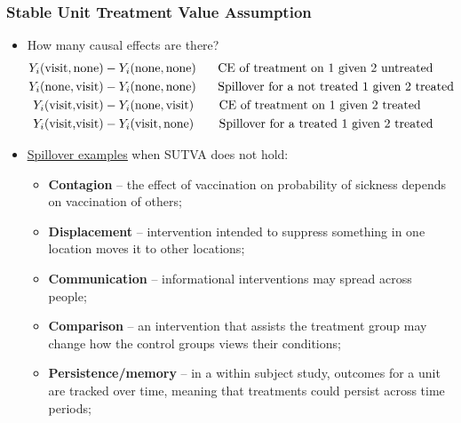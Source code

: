 \documentclass[aspectratio=169]{beamer}
\theoremstyle{principle}
\begin{document}
\begin{frame}
\frametitle{Stable Unit Treatment Value Assumption}
\begin{itemize}
\item How many causal effects are there?
\begin{align*}
Y_i(\mbox{visit},\mbox{none}) &- Y_i(\mbox{none},\mbox{none}) \hspace{5mm}\mbox{ CE of treatment on 1 given 2 untreated}\\
Y_i(\mbox{none},\mbox{visit}) &- Y_i(\mbox{none},\mbox{none}) \hspace{5mm}\mbox{ Spillover for a not treated 1 given 2 treated}\\
Y_i(\mbox{visit,visit}) &- Y_i(\mbox{none},\mbox{visit}) \hspace{6mm}\mbox{ CE of treatment on 1 given 2 treated}\\
Y_i(\mbox{visit,visit}) &- Y_i(\mbox{visit},\mbox{none}) \hspace{6mm}\mbox{ Spillover for a treated 1 given 2 treated}
\end{align*}

\item \href{https://community.lawschool.cornell.edu/wp-content/uploads/2020/12/Green-presentation-on-SUTVA-for-CELS.pdf}{\color{blue}\underline{Spillover examples}} \color{black} when SUTVA does not hold:
\begin{itemize}
\item \textbf{Contagion} -- the effect of vaccination on probability of sickness depends on vaccination of others;
\item \textbf{Displacement} -- intervention intended to suppress something in one location moves it to other locations;
\item \textbf{Communication} -- informational interventions may spread across people;
\item \textbf{Comparison} -- an intervention that assists the treatment group may change how the control groups views their conditions;
\item \textbf{Persistence/memory} -- in a within subject study, outcomes for a unit are tracked over time, meaning that treatments could persist across time periods;
\end{itemize}
\end{itemize}
\end{frame}
\end{document}
